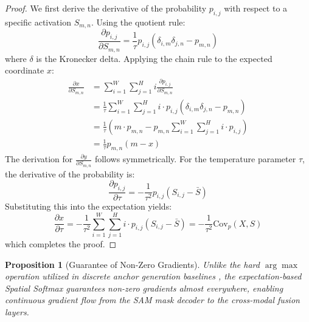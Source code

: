 \documentclass[onecolumn]{IEEEtran}
\numberwithin{equation}{section}
\newtheorem{proposition}[theorem]{Proposition}
\theoremstyle{definition}
\theoremstyle{remark}
\begin{document}
\begin{proof}
We first derive the derivative of the probability \(p_{i,j}\) with respect to a specific activation \(S_{m,n}\). Using the quotient rule:
\begin{equation}
    \frac{\partial p_{i,j}}{\partial S_{m,n}} = \frac{1}{\tau} p_{i,j} (\delta_{i,m}\delta_{j,n} - p_{m,n})
\end{equation}
where \(\delta\) is the Kronecker delta. Applying the chain rule to the expected coordinate \(x\):
\begin{align}
    \frac{\partial x}{\partial S_{m,n}} &= \sum_{i=1}^W \sum_{j=1}^H i \frac{\partial p_{i,j}}{\partial S_{m,n}} \nonumber \\
    &= \frac{1}{\tau} \sum_{i=1}^W \sum_{j=1}^H i \cdot p_{i,j} (\delta_{i,m}\delta_{j,n} - p_{m,n}) \nonumber \\
    &= \frac{1}{\tau} \left( m \cdot p_{m,n} - p_{m,n} \sum_{i=1}^W \sum_{j=1}^H i \cdot p_{i,j} \right) \nonumber \\
    &= \frac{1}{\tau} p_{m,n} (m - x)
\end{align}
The derivation for \(\frac{\partial y}{\partial S_{m,n}}\) follows symmetrically. For the temperature parameter \(\tau\), the derivative of the probability is:
\begin{equation}
    \frac{\partial p_{i,j}}{\partial \tau} = -\frac{1}{\tau^2} p_{i,j} (S_{i,j} - \bar{S})
\end{equation}
Substituting this into the expectation yields:
\begin{equation}
    \frac{\partial x}{\partial \tau} = -\frac{1}{\tau^2} \sum_{i=1}^W \sum_{j=1}^H i \cdot p_{i,j} (S_{i,j} - \bar{S}) = -\frac{1}{\tau^2} \mathrm{Cov}_{p}(X, S)
\end{equation}
which completes the proof.
\end{proof}

\begin{proposition}[Guarantee of Non-Zero Gradients]
\label{prop:nonzero_gradients}
Unlike the hard \(\arg\max\) operation utilized in discrete anchor generation baselines \cite{xie2025self, chen2024un}, the expectation-based Spatial Softmax guarantees non-zero gradients almost everywhere, enabling continuous gradient flow from the SAM mask decoder \cite{kirillov2023segment} to the cross-modal fusion layers.
\end{proposition}
\end{document}
